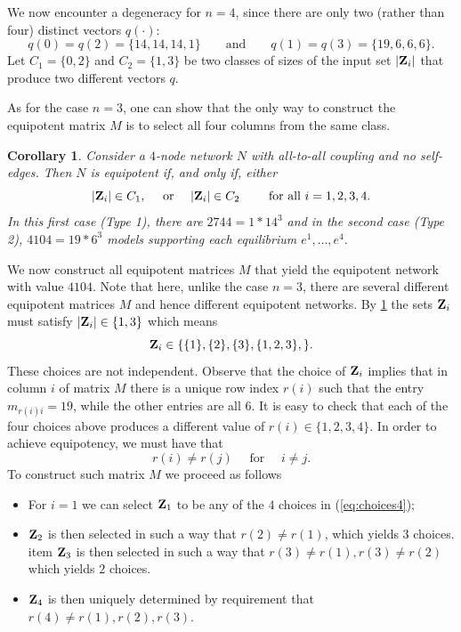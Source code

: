 \documentclass[12pt]{amsart}
\newcommand{\bZ}{{\bf Z}}
\newtheorem{cor}[thm]{Corollary}
\theoremstyle{definition}
\begin{document}
We now encounter a degeneracy for $n=4$, since there are only two (rather than four) distinct vectors $q(\cdot)$: 
\[ q(0) =q(2) = \{14,14,14,1\}
\qquad\text{and}\qquad
q(1) =q(3)= \{19,6,6,6\}.
\]
Let $C_1=\{0,2\}$ and $C_2=\{1,3\}$
be two classes of sizes of the input set $|\bZ_i|$ that produce two different vectors $q$.

As for the case $n=3$, one can show that the only way to construct the equipotent matrix $M$ is to select all four columns from the same class.

\begin{cor}\label{cor:two}
Consider a $4$-node network $N$ with all-to-all coupling and no self-edges. Then $N$ is equipotent if, and only if, either 
\[ |\bZ_i| \in C_1, \quad \mbox{ or } \quad |\bZ_i| \in C_2 \qquad \mbox{ for all } i=1,2,3,4.\] 
In this first case (Type 1), there are $2744 = 1*14^3$ and in the second case (Type 2), $4104= 19*6^3$ models supporting each equilibrium $e^1, \ldots, e^4.$
\end{cor}

We now construct all equipotent matrices $M$ that yield the equipotent network with value $4104$. Note that here, unlike the case $n=3$, there are several different equipotent matrices $M$ and hence different equipotent networks. By \cref{cor:two} the sets $\bZ_i$  must satisfy \(|\bZ_i| \in \{1,3\}\) which means
\begin{equation}\label{eq:choices4}
\bZ_i \in \{ \{1\}, \{2\},\{3\},\{1,2,3\},\}.
\end{equation}
These choices are not independent.
Observe that the choice of $\bZ_i$ implies that in column $i$ of matrix $M$ there is a unique row index $r(i)$ such that the entry $m_{r(i)i}=19$, while the other entries are all $6$. It is easy to check that each of the four choices above produces a different value of $r(i)\in \{ 1,2,3,4\}.$ In order to achieve equipotency, we must have that 
\[ r(i)\not= r(j) \quad \mbox{ for } \quad i\not= j.\]
To construct such matrix $M$ we proceed as follows
\begin{itemize}
\item For $i=1$ we can select $\bZ_1$ to be any of the $4$ choices in (\ref{eq:choices4});
\item $\bZ_2$ is then selected in such a way that $r(2)\not= r(1)$, which yields $3$ choices. 
item $\bZ_3$ is then selected in such a way that $r(3)\not= r(1),r(3) \not=r(2)$ which yields $2$ choices. 
\item $\bZ_4$ is then uniquely determined by requirement that $r(4)\not= r(1),r(2),r(3)$.
\end{itemize}
\end{document}
